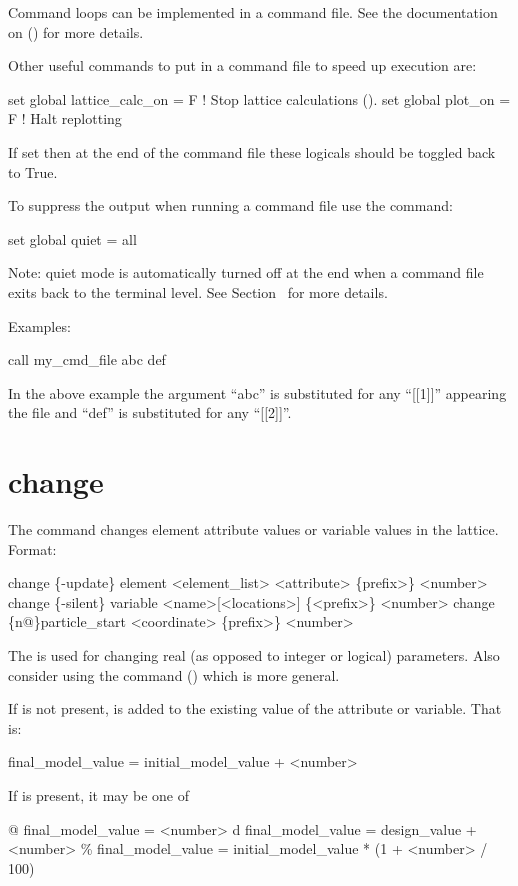 Command loops can be implemented in a command file. See the documentation on 
() for more details.

Other useful commands to put in a command file to speed up execution are:
\begin{example}
  set global lattice_calc_on = F   ! Stop lattice calculations ().
  set global plot_on = F           ! Halt replotting
\end{example}
If set then at the end of the command file these logicals should be toggled back to True.

To suppress the output when running a command file use the command:
\begin{example}
  set global quiet = all
\end{example}
Note: quiet mode is automatically turned off at the end when a command file exits back to the
terminal level. See Section~ for more details.

Examples:
\begin{example}
    call my_cmd_file abc def 
\end{example}
In the above example the argument ``abc'' is substituted for any ``[[1]]'' appearing the
file and ``def'' is substituted for any ``[[2]]''.  \Newline

\section{change}
\label{s:change}

The  command changes element attribute values or variable values in the
 lattice. Format:
\begin{example}
  change \{-update\} element <element_list> <attribute> \{prefix>\} <number>
  change \{-silent\} variable <name>[<locations>] \{<prefix>\} <number>
  change  \{n@\}particle_start <coordinate> \{prefix>\} <number>
\end{example}

\vskip 10pt 

The  is used for changing real (as opposed to integer or logical)
parameters. Also consider using the  command () which is more general.

If  is not present,  is added to the existing value
of the attribute or variable. That is:
\begin{example}
  final_model_value = initial_model_value + <number>
\end{example}
If  is present, it may be one of
\begin{example}
  @       final_model_value = <number>
  d       final_model_value = design_value + <number>
  \%       final_model_value = initial_model_value * (1 + <number> / 100)
\end{example}

